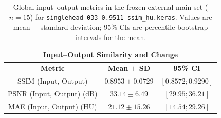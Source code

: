 \begin{table}[htbp]
\centering
\small
\begin{tabular}{ccc}
\multicolumn{3}{c}{\textbf{Input--Output Similarity and Change}} \\[3pt]
\hline
\textbf{Metric} & \textbf{Mean $\pm$ SD} & \textbf{95\% CI} \\
\hline
SSIM (Input, Output) & $0.8953 \pm 0.0729$ & $[0.8572; 0.9290]$ \\
PSNR (Input, Output) (dB) & $33.14 \pm 6.49$ & $[29.95; 36.21]$ \\
MAE (Input, Output) (HU) & $21.12 \pm 15.26$ & $[14.54; 29.26]$ \\
\hline
\end{tabular}
\captionsetup{skip=2pt}
\caption[External input-output global metrics]{Global input--output metrics in the frozen external main set ($n=15$) for \texttt{singlehead-033-0.9511-ssim\_hu.keras}. Values are mean $\pm$ standard deviation; 95\% CIs are percentile bootstrap intervals for the mean.}
\label{tab:external-input-output-global}
\end{table}
